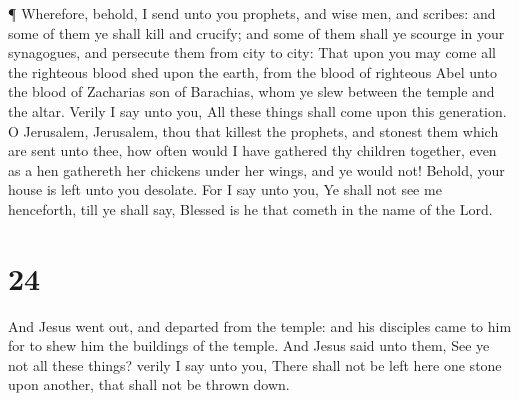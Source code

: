  ¶ Wherefore, behold, I send unto you prophets, and wise
men, and scribes: and some of them ye shall kill and crucify; and some
of them shall ye scourge in your synagogues, and persecute them from
city to city:  That upon you may come all the righteous
blood shed upon the earth, from the blood of righteous Abel unto the
blood of Zacharias son of Barachias, whom ye slew between the temple and
the altar.  Verily I say unto you, All these things shall
come upon this generation.  O Jerusalem, Jerusalem, thou
that killest the prophets, and stonest them which are sent unto thee,
how often would I have gathered thy children together, even as a hen
gathereth her chickens under her wings, and ye would not! 
Behold, your house is left unto you desolate.  For I say
unto you, Ye shall not see me henceforth, till ye shall say, Blessed is
he that cometh in the name of the Lord.

\hypertarget{section-23}{%
\section{24}\label{section-23}}

 And Jesus went out, and departed from the temple: and his
disciples came to him for to shew him the buildings of the temple.
 And Jesus said unto them, See ye not all these things?
verily I say unto you, There shall not be left here one stone upon
another, that shall not be thrown down.

